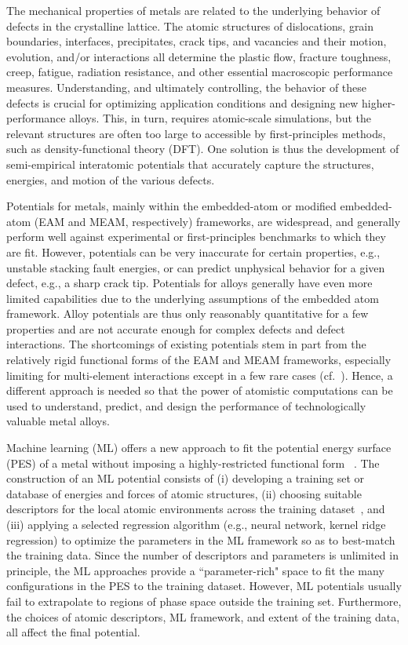 \documentclass{article}
\begin{document}
The mechanical properties of metals are related to the underlying behavior of defects in the crystalline lattice. The atomic structures of dislocations, grain boundaries, interfaces, precipitates, crack tips, and vacancies and their motion, evolution, and/or interactions all determine the plastic flow, fracture toughness, creep, fatigue, radiation resistance, and other essential macroscopic performance measures.   Understanding, and ultimately controlling, the behavior of these defects is crucial for optimizing application conditions and designing new higher-performance alloys.  This, in turn, requires atomic-scale simulations, but the relevant structures are often too large to accessible by first-principles methods, such as density-functional theory (DFT). One solution is thus the development of semi-empirical interatomic potentials that accurately capture the structures, energies, and motion of the various defects.

Potentials for metals, mainly within the embedded-atom or modified embedded-atom (EAM and MEAM, respectively) frameworks, are widespread, and generally perform well against experimental or first-principles benchmarks to which they are fit.
However, potentials can be very inaccurate for certain properties, e.g., unstable stacking fault energies, or can predict unphysical behavior for a given defect, e.g., a sharp crack tip.
Potentials for alloys generally have even more limited capabilities due to the underlying assumptions of the embedded atom framework.  Alloy potentials are thus only reasonably quantitative for a few properties and are not accurate enough for complex defects and defect interactions.
The shortcomings of existing potentials stem in part from the relatively rigid functional forms of the EAM and MEAM frameworks, especially limiting for multi-element interactions except in a few rare cases (cf.~\cite{Juslin2005AnalyticalSystem}).
Hence, a different approach is needed so that the power of atomistic computations can be used to understand, predict, and design the performance of technologically valuable metal alloys.

Machine learning (ML) offers a new approach to fit the potential energy surface (PES)
of a metal without imposing a highly-restricted functional form ~\cite{Bartok2013,Behler2015,Kobayashi2017,PurjaPun0PhysicallyMaterials,Wang2018}.
The construction of an ML potential consists of (i) developing a training set or database of energies and forces of atomic structures, (ii) choosing suitable descriptors for the local atomic environments across the training dataset~\cite{Behler2007,Rogers2010Extended-connectivityFingerprints,Bartok2015,Faber2017PredictionError}, and (iii) applying a selected regression algorithm (e.g., neural network, kernel ridge regression) to optimize the parameters in the ML framework so as to best-match the training data.
Since the number of descriptors and parameters is unlimited in principle, the ML approaches provide a ``parameter-rich" space to fit the many configurations in the PES to the training dataset.
However, ML potentials usually fail to extrapolate to regions of phase space outside the training set. Furthermore, the choices of atomic descriptors, ML framework, and extent of the training data, all affect the final potential.
\end{document}

